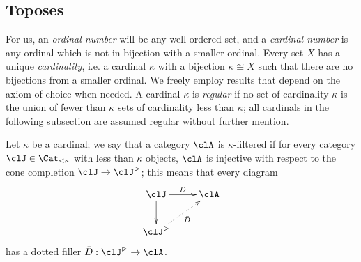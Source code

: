 \documentclass{amsart}
\begin{document}
\subsection{Toposes}\leavevmode
{}
For us, an \emph{ordinal number} will be any well\hyp{}ordered set, and a \emph{cardinal number} is any ordinal which is not in bijection with a smaller ordinal. Every set $X$ has a unique \emph{cardinality}, i.e. a cardinal $\kappa$ with a bijection $\kappa \cong X$ such that there are no bijections from a smaller ordinal. We freely employ results that depend on the axiom of choice when needed. A cardinal $\kappa$ is \emph{regular} if no set of cardinality $\kappa$ is the union of fewer than $\kappa$ sets of cardinality less than $\kappa$; all cardinals in the following subsection are assumed regular without further mention.

Let $\kappa$ be a cardinal; we say that a category $\clA$ is $\kappa$\hyp{}filtered if for every category $\clJ\in\Cat_{<\kappa}$ with less than $\kappa$ objects, $\clA$ is injective with respect to the cone completion $\clJ\to \clJ^\rhd$; this means that every diagram
\[
  \vcenter{\xymatrix{
      \clJ\ar[d]\ar[r]^D & \clA \\
      \clJ^\rhd\ar@{.>}[ur]_{\bar D}
    }}
\]
has a dotted filler $\bar D : \clJ^\rhd \to \clA$.
\end{document}
